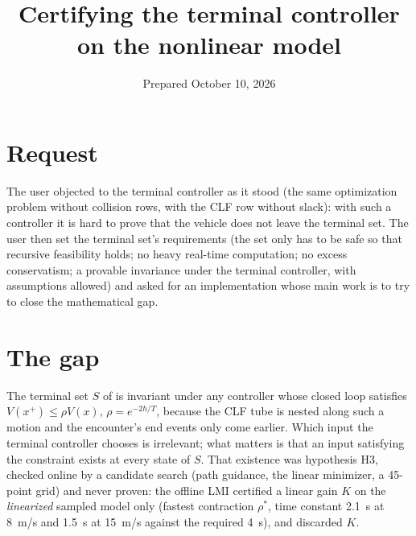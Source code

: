 \documentclass[11pt]{article}
\title{Certifying the terminal controller on the nonlinear model}
\date{Prepared October 10, 2026}
\begin{document}
\maketitle

\section{Request}
The user objected to the terminal controller as it stood (the same
optimization problem without collision rows, with the CLF row without
slack): with such a controller it is hard to prove that the vehicle does not
leave the terminal set. The user then set the terminal set's requirements
(the set only has to be safe so that recursive feasibility holds; no heavy
real-time computation; no excess conservatism; a provable invariance under
the terminal controller, with assumptions allowed) and asked for an
implementation whose main work is to try to close the mathematical gap.

\section{The gap}
The terminal set $S$ of  is invariant
under any controller whose closed loop satisfies $V(x^+)\le\rho V(x)$,
$\rho=e^{-2h/T}$, because the CLF tube is nested along such a motion and the
encounter's end events only come earlier. Which input the terminal
controller chooses is irrelevant; what matters is that an input satisfying
the constraint exists at every state of $S$. That existence was hypothesis
H3, checked online by a candidate search (path guidance, the linear
minimizer, a 45-point grid) and never proven: the offline LMI certified a
linear gain $K$ on the \emph{linearized} sampled model only (fastest
contraction $\rho^*$, time constant 2.1~s at 8~m/s and 1.5~s at 15~m/s
against the required 4~s), and discarded $K$.
\end{document}
